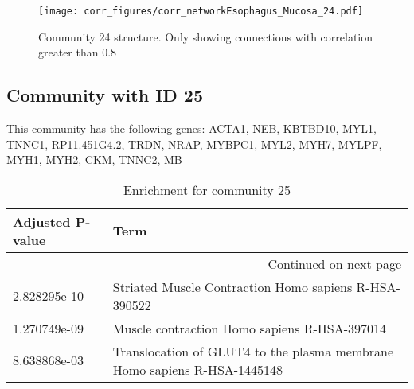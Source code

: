 \begin{figure}[h!]
\centering
\texttt{[image: corr\_figures/corr\_networkEsophagus\_Mucosa\_24.pdf]}
\caption{Community 24 structure. Only showing connections with correlation greater than 0.8}
\end{figure}




\subsection*{Community with ID 25}
This community has the following genes: ACTA1, NEB, KBTBD10, MYL1, TNNC1, RP11.451G4.2, TRDN, NRAP, MYBPC1, MYL2, MYH7, MYLPF, MYH1, MYH2, CKM, TNNC2, MB
\\
\begin{longtable}{p{2.4cm}p{14.5cm}}
\caption{Enrichment for community 25}\\
\toprule
Adjusted \newline P-value &                                                                      Term \\
\midrule
\endhead
\midrule
\multicolumn{2}{r}{{Continued on next page}} \\
\midrule
\endfoot

\bottomrule
\endlastfoot
             2.828295e-10 &                     Striated Muscle Contraction Homo sapiens R-HSA-390522 \\
             1.270749e-09 &                              Muscle contraction Homo sapiens R-HSA-397014 \\
             8.638868e-03 &  Translocation of GLUT4 to the plasma membrane Homo sapiens R-HSA-1445148 \\
\end{longtable}


